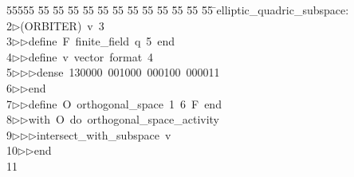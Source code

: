 %
%
\begin{tabbing}
55555 \= 55 \= 55 \= 55 \= 55 \= 55 \= 55 \= 55 \= 55 \= 55 \= 55 \= 55 \= 55 \= \>elliptic\_quadric\_subspace:\\[0pt]
2\>$\triangleright$\>(ORBITER)\ v\ 3\ \\[0pt]
3\>$\triangleright$\>$\triangleright$\>define\ F\ finite\_field\ q\ 5\ end\ \\[0pt]
4\>$\triangleright$\>$\triangleright$\>define\ v\ vector\ format\ 4\ \\[0pt]
5\>$\triangleright$\>$\triangleright$\>$\triangleright$\>dense\ 130000\ 001000\ 000100\ 000011\ \\[0pt]
6\>$\triangleright$\>$\triangleright$\>end\ \\[0pt]
7\>$\triangleright$\>$\triangleright$\>define\ O\ orthogonal\_space\ 1\ 6\ F\ end\ \\[0pt]
8\>$\triangleright$\>$\triangleright$\>with\ O\ do\ orthogonal\_space\_activity\ \\[0pt]
9\>$\triangleright$\>$\triangleright$\>$\triangleright$\>intersect\_with\_subspace\ v\ \\[0pt]
10\>$\triangleright$\>$\triangleright$\>end\\[0pt]
11\>\end{tabbing}
